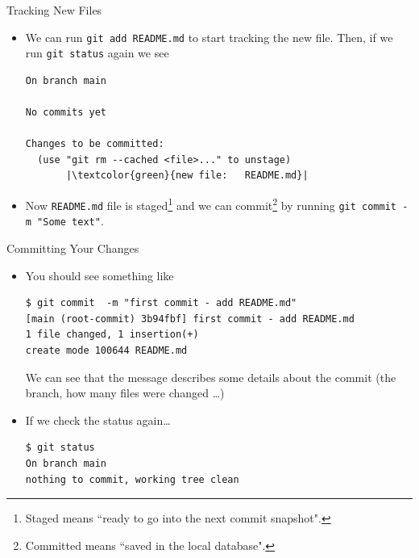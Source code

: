 \documentclass[
hyperref={bookmarks=false},
xcolor={dvipsnames,svgnames*,x11names*}, 
12pt
]{beamer}
\begin{document}
\begin{frame}[fragile]{Tracking New Files}
\vspace{-0.5cm}
\begin{itemize}
\itemsep 2ex
\item We can run \texttt{git add README.md} to start tracking the new file. Then, if we run \texttt{git status} again we see
\begin{lstlisting}
On branch main

No commits yet

Changes to be committed:
  (use "git rm --cached <file>..." to unstage)
       |\textcolor{green}{new file:   README.md}|
\end{lstlisting}
\item Now \texttt{README.md} file is staged\footnote{Staged means ``ready to go into the next commit snapshot".} and we can commit\footnote{Committed means ``saved in the local database".} by running \texttt{git commit -m "Some text"}.  
\end{itemize}
\end{frame}

\begin{frame}[fragile]{Committing Your Changes}
\vspace{-0.5cm}
\begin{itemize}
\itemsep 2ex
\item You should see something like
\begin{lstlisting}
$ git commit  -m "first commit - add README.md"
[main (root-commit) 3b94fbf] first commit - add README.md
1 file changed, 1 insertion(+)
create mode 100644 README.md
\end{lstlisting}
We can see that the message describes some details about the commit (the branch, how many files were changed \dots)
\item If we check the status again\dots
\begin{lstlisting}
$ git status
On branch main
nothing to commit, working tree clean	
\end{lstlisting}
\end{itemize}
\end{frame}
\end{document}
